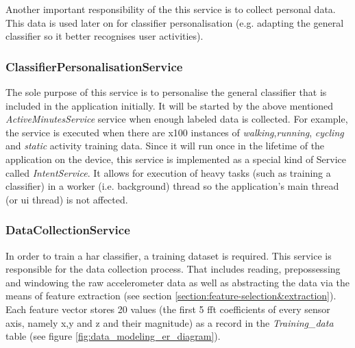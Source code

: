             Another important responsibility of the this service is to collect personal data. This data is used later on for classifier personalisation (e.g. adapting the general classifier so it better recognises user activities).
            
            \subsubsection{ClassifierPersonalisationService}
            The sole purpose of this service is to personalise the general classifier that is included in the application initially. It will be started by the above mentioned \textit{ActiveMinutesService} service when enough labeled data is collected. For example, the service is executed when there are x100 instances of \textit{walking},\textit{running}, \textit{cycling} and \textit{static} activity training data. Since it will run once in the lifetime of the application on the device, this service is implemented as a special kind of Service called \textit{IntentService}. It allows for execution of heavy tasks (such as training a classifier) in a worker (i.e. background) thread so the application's main thread (or \gls{ui} thread) is not affected.
            
            \subsubsection{DataCollectionService}
            \label{section:data_collection_service}
            In order to train a \gls{har} classifier, a training dataset is required. This service is responsible for the data collection process. That includes reading, prepossessing and windowing the raw accelerometer data as well as abstracting the data via the means of feature extraction (see section \ref{section:feature-selection&extraction}). Each feature vector stores 20 values (the first 5 \gls{fft} coefficients of every sensor axis, namely x,y and z and their magnitude) as a record in the \textit{Training\_data} table (see figure \ref{fig:data_modeling_er_diagram}).
            
